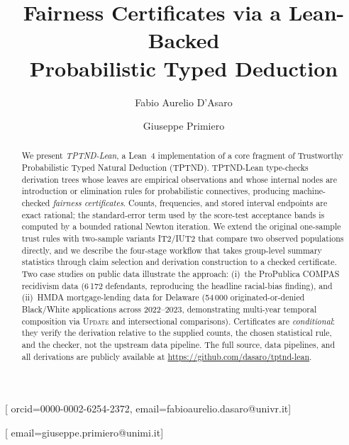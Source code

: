\documentclass{ceurart}
\begin{document}

\title{Fairness Certificates via a Lean-Backed\\Probabilistic Typed Deduction}

\author[1,2]{Fabio Aurelio D'Asaro}[
  orcid=0000-0002-6254-2372,
  email=fabioaurelio.dasaro@univr.it]
\cormark[1]

\author[3]{Giuseppe Primiero}[
  email=giuseppe.primiero@unimi.it]

\address[1]{Department of Human Sciences,
  University of Verona, Italy}

\address[2]{Department of Information Studies,
  University College London, UK}

\address[3]{Department of Philosophy ``Piero Martinetti,''
  University of Milan, Italy}


\begin{abstract}
We present \emph{TPTND-Lean}, a Lean~4 implementation of a core fragment of
Trustworthy Probabilistic Typed Natural Deduction (TPTND).
TPTND-Lean type-checks derivation trees whose leaves are empirical observations
and whose internal nodes are introduction or elimination rules for
probabilistic connectives, producing machine-checked
\emph{fairness certificates}.
Counts, frequencies, and stored interval endpoints are exact
rational; the standard-error term used by the score-test
acceptance bands is computed by a bounded rational Newton
iteration.  We extend the original one-sample trust rules with
two-sample variants \textsc{IT2}/\textsc{IUT2} that compare two
observed populations directly, and we describe the four-stage
workflow that takes group-level summary statistics through claim
selection and derivation construction to a checked certificate.
Two case studies on public data illustrate the approach:
(i)~the ProPublica COMPAS recidivism data (6\,172 defendants,
reproducing the headline racial-bias finding), and
(ii)~HMDA mortgage-lending data for Delaware
(54\,000 originated-or-denied Black/White applications across
2022--2023, demonstrating multi-year temporal composition via
\textsc{Update} and intersectional comparisons).
Certificates are \emph{conditional}: they verify the derivation
relative to the supplied counts, the chosen statistical rule, and
the checker, not the upstream data pipeline.
The full source, data pipelines, and all derivations are
publicly available at \url{https://github.com/dasaro/tptnd-lean}.
\end{abstract}
\end{document}
